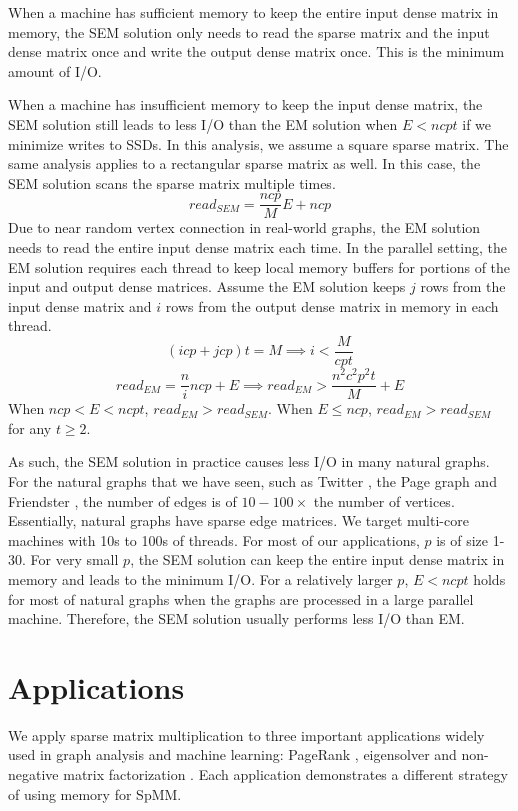 When a machine has sufficient memory to keep the entire input dense matrix
in memory, the SEM solution only needs to read the sparse matrix and the input
dense matrix once and write the output dense matrix once. This is
the minimum amount of I/O.

When a machine has insufficient memory to keep the input dense matrix, the SEM
solution still leads to less I/O than the EM solution when $E < n c p t$ if we
minimize writes to SSDs.
In this analysis, we assume a square sparse matrix. The same analysis applies
to a rectangular sparse matrix as well.
In this case, the SEM solution scans the sparse matrix multiple times.
\begin{equation*}
read_{SEM} = \frac{n c p}{M} E + n c p
\end{equation*}
Due to near random vertex connection in real-world graphs, the EM solution needs to
read the entire input dense matrix each time. In the parallel setting,
the EM solution requires each thread to keep local memory buffers for portions
of the input and output dense matrices. Assume the EM solution keeps $j$ rows
from the input dense matrix and $i$ rows from the output dense matrix in memory
in each thread.
\begin{equation*}
(i c p + j c p) t = M \implies i < \frac{M}{c p t}
\end{equation*}
\begin{equation*}
read_{EM} = \frac{n}{i} n c p + E \implies  read_{EM} > \frac{n^2 c^2 p^2 t}{M} + E
\end{equation*}
When $n c p < E < n c p t$, $read_{EM} > read_{SEM}$.
When $E \leq n c p$, $read_{EM} > read_{SEM}$ for any $t \geq 2$.

As such, the SEM solution in practice causes less I/O in many natural graphs.
For the natural graphs that we have seen, such as Twitter \cite{twitter},
the Page graph \cite{web_graph} and Friendster \cite{friendster}, the number
of edges is of $10-100 \times$ the number of vertices. Essentially,
natural graphs have sparse edge matrices. We target multi-core machines with
10s to 100s of threads. For most of our applications, $p$ is of size 1-30.
For very small $p$, the SEM solution can keep the entire input dense matrix
in memory and leads to the minimum I/O. For a relatively larger $p$, $E < n c p t$
holds for most of natural graphs when the graphs are processed in a large
parallel machine. Therefore, the SEM solution usually performs less I/O than EM.

\section{Applications} \label{sec:spmm:apps}
We apply sparse matrix multiplication to three important applications widely
used in graph analysis and machine learning: PageRank \cite{pagerank},
eigensolver \cite{anasazi} and non-negative matrix factorization \cite{nmf}.
Each application demonstrates a different strategy of using memory for SpMM.

